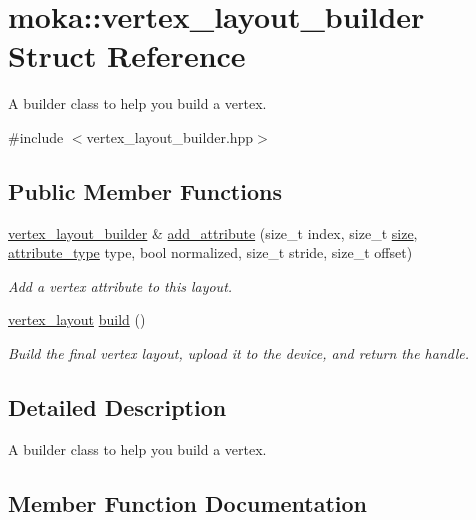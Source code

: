 \hypertarget{structmoka_1_1vertex__layout__builder}{}\section{moka\+::vertex\+\_\+layout\+\_\+builder Struct Reference}
\label{structmoka_1_1vertex__layout__builder}


A builder class to help you build a vertex.  




{\ttfamily \#include $<$vertex\+\_\+layout\+\_\+builder.\+hpp$>$}

\subsection*{Public Member Functions}
\begin{DoxyCompactItemize}
\item 
\mbox{\hyperlink{structmoka_1_1vertex__layout__builder}{vertex\+\_\+layout\+\_\+builder}} \& \mbox{\hyperlink{structmoka_1_1vertex__layout__builder_a1842f3c5d25d3c5e8305ed12b2c19036}{add\+\_\+attribute}} (size\+\_\+t index, size\+\_\+t \mbox{\hyperlink{namespacemoka_a4f125ee95d9889b23c3259d1fba4c2e4}{size}}, \mbox{\hyperlink{namespacemoka_a1fe222f346eb65977e1069323023faa5}{attribute\+\_\+type}} type, bool normalized, size\+\_\+t stride, size\+\_\+t offset)
\begin{DoxyCompactList}\small\item\em Add a vertex attribute to this layout. \end{DoxyCompactList}\item 
\mbox{\hyperlink{classmoka_1_1vertex__layout}{vertex\+\_\+layout}} \mbox{\hyperlink{structmoka_1_1vertex__layout__builder_adf7d175b295be4df5e76d97d9ca661a2}{build}} ()
\begin{DoxyCompactList}\small\item\em Build the final vertex layout, upload it to the device, and return the handle. \end{DoxyCompactList}\end{DoxyCompactItemize}


\subsection{Detailed Description}
A builder class to help you build a vertex. 

\subsection{Member Function Documentation}
\mbox{\label{structmoka_1_1vertex__layout__builder_a1842f3c5d25d3c5e8305ed12b2c19036}} 
